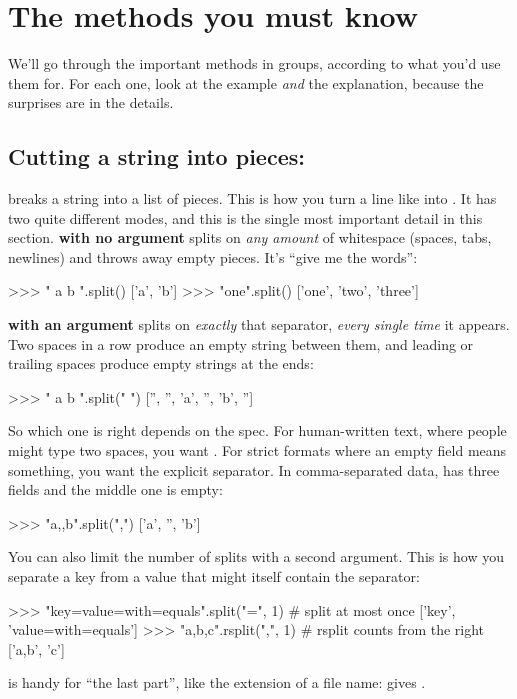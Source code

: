 \documentclass[10pt,a4paper]{article}
\begin{document}
\section{The methods you must know}
We’ll go through the important methods in groups, according to what you’d use them for. For each one, look at the example \emph{and} the explanation, because the surprises are in the details.
\subsection{Cutting a string into pieces: }
 breaks a string into a list of pieces. This is how you turn a line like  into .
It has two quite different modes, and this is the single most important detail in this section.
\textbf{ with no argument} splits on \emph{any amount} of whitespace (spaces, tabs, newlines) and throws away empty pieces. It’s “give me the words”:
\begin{txtcode}
>>> "  a  b ".split()
['a', 'b']
>>> "one\ttwo\nthree".split()
['one', 'two', 'three']
\end{txtcode}
\textbf{ with an argument} splits on \emph{exactly} that separator, \emph{every single time} it appears. Two spaces in a row produce an empty string between them, and leading or trailing spaces produce empty strings at the ends:
\begin{txtcode}
>>> "  a  b ".split(" ")
['', '', 'a', '', 'b', '']
\end{txtcode}
So which one is right depends on the spec. For human-written text, where people might type two spaces, you want . For strict formats where an empty field means something, you want the explicit separator. In comma-separated data,  has three fields and the middle one is empty:
\begin{txtcode}
>>> "a,,b".split(",")
['a', '', 'b']
\end{txtcode}
You can also limit the number of splits with a second argument. This is how you separate a key from a value that might itself contain the separator:
\begin{txtcode}
>>> "key=value=with=equals".split("=", 1)    # split at most once
['key', 'value=with=equals']
>>> "a,b,c".rsplit(",", 1)                   # rsplit counts from the right
['a,b', 'c']
\end{txtcode}
 is handy for “the last part”, like the extension of a file name:  gives .
\end{document}
